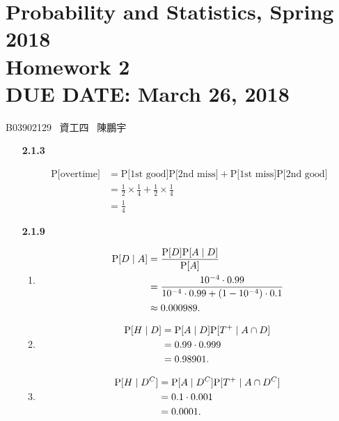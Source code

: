\documentclass{article}
\newcommand{\hmwkClass}{Probability and Statistics, Spring 2018}
\newcommand{\hmwkTitle}{Homework 2}
\newcommand{\hmwkDueDate}{March 26, 2018}
\begin{document}
\thispagestyle{empty}
\section*{\hmwkClass \\
    \normalsize{\hmwkTitle} \\
    \normalsize{DUE DATE: \hmwkDueDate}
}

\hfill{B03902129 \, 資工四 \, 陳鵬宇}

\begin{enumerate}
    \item [\textbf{2.1.3}]

    \begin{align*}
    \mbox{P[overtime]} 
        & = \mbox{P[1st good]P[2nd miss]} + \mbox{P[1st miss]P[2nd good]} \\
        & = \frac{1}{2} \times \frac{1}{4} + \frac{1}{2} \times \frac{1}{4} \\
        & = \frac{1}{4}
    \end{align*}

    \item [\textbf{2.1.9}]

    \begin{enumerate}[label=(\alph*)]
        \item
        \begin{align*}
        \mbox P[D \mid A] 
            & = \frac{\mbox P[D] \mbox P[A \mid D]}{\mbox P[A]} \\
            & = \frac{10^{-4} \cdot 0.99}{10^{-4} \cdot 0.99 + (1 - 10^{-4}) \cdot 0.1} \\
            & \approx 0.000989.
        \end{align*}

        \item 
        \begin{align*}
        \mbox P[H \mid D] 
            & = \mbox P[A \mid D] \mbox P[T^+ \mid A \cap D] \\
            & = 0.99 \cdot 0.999 \\
            & = 0.98901.
        \end{align*}
        
        \item 
        \begin{align*}
        \mbox P[H \mid D^C]
            & = \mbox P[A \mid D^C] \mbox P[T^+ \mid A \cap D^C] \\
            & = 0.1 \cdot 0.001 \\
            & = 0.0001.
        \end{align*}


\end{enumerate}
\end{enumerate}
\end{document}

